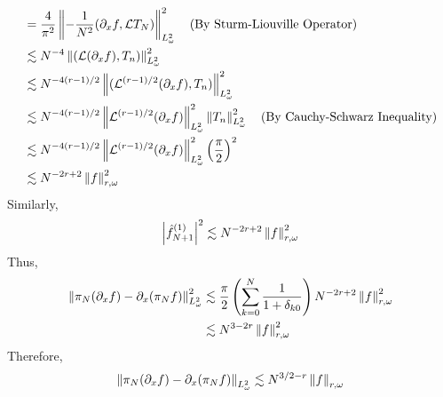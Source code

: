 \documentclass[a4paper,8pt]{article}
\begin{document}
\begin{enumerate}[label=Q\arabic	*.]
\begin{enumerate}[label=(\alph*)]
\begin{align}
&= \frac{4}{\pi^2} \left\lVert-\frac{1}{N^2} (\partial_x f, \mathcal{L} T_N)\right\rVert^2_{L^2_{\omega}} \ \ \ \text{(By Sturm-Liouville Operator)} \nonumber \\
&\lesssim N^{-4} \left\lVert(\mathcal{L}(\partial_x f), T_n)\right\rVert^2_{L^2_{\omega}} \nonumber \\
&\lesssim N^{-4(r-1)/2} \left\lVert(\mathcal{L}^{(r-1)/2}(\partial_x f), T_n)\right\rVert^2_{L^2_{\omega}} \nonumber \\
&\lesssim N^{-4(r-1)/2} \left\lVert\mathcal{L}^{(r-1)/2}(\partial_x f)\right\rVert^2_{L^2_{\omega}} \left\lVert T_n\right\rVert^2_{L^2_{\omega}} \ \ \ \text{(By Cauchy-Schwarz Inequality)} \nonumber \\
&\lesssim N^{-4(r-1)/2} \left\lVert\mathcal{L}^{(r-1)/2}(\partial_x f)\right\rVert^2_{L^2_{\omega}} \left(\frac{\pi}{2} \right)^2 \nonumber \\
&\lesssim N^{-2r+2} \left\lVert f\right\rVert^2_{r, \omega} \nonumber
\end{align}
Similarly, 
\begin{equation}
\left\lvert\hat{f}^{(1)}_{N+1}\right\rvert^2 \lesssim N^{-2r+2} \left\lVert f\right\rVert^2_{r, \omega} \nonumber
\end{equation}
Thus,
\begin{align}
\left\lVert\pi_N(\partial_x f) - \partial_x(\pi_Nf)\right\rVert^2_{L^2_{\omega}} &\lesssim \frac{\pi}{2} \left( \sum\limits_{k=0}^N \frac{1}{1+ \delta_{k0}} \right) N^{-2r+2} \left\lVert f\right\rVert^2_{r, \omega} \nonumber \\
&\lesssim N^{3-2r} \left\lVert f\right\rVert^2_{r, \omega} \nonumber
\end{align}
Therefore,
\begin{equation}
\left\lVert\pi_N(\partial_x f) - \partial_x(\pi_Nf)\right\rVert_{L^2_{\omega}} \lesssim N^{3/2-r} \left\lVert f\right\rVert_{r, \omega} \nonumber
\end{equation}
\end{enumerate}
\end{enumerate}
\end{document}
